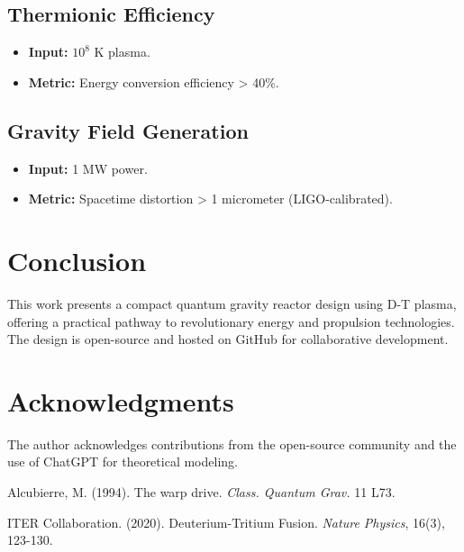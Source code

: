 \documentclass[12pt, a4paper]{article}
\begin{document}
\subsection{Thermionic Efficiency}
\begin{itemize}
\item \textbf{Input:} $10^8$ K plasma.
\item \textbf{Metric:} Energy conversion efficiency > 40\%.
\end{itemize}

\subsection{Gravity Field Generation}
\begin{itemize}
\item \textbf{Input:} 1 MW power.
\item \textbf{Metric:} Spacetime distortion > 1 micrometer (LIGO-calibrated).
\end{itemize}

\section{Conclusion}
This work presents a compact quantum gravity reactor design using D-T plasma, offering a practical pathway to revolutionary energy and propulsion technologies. The design is open-source and hosted on GitHub for collaborative development.

\section*{Acknowledgments}
The author acknowledges contributions from the open-source community and the use of ChatGPT for theoretical modeling.

\begin{thebibliography}{9}
Alcubierre, M. (1994). The warp drive. \textit{Class. Quantum Grav.} 11 L73.

ITER Collaboration. (2020). Deuterium-Tritium Fusion. \textit{Nature Physics}, 16(3), 123-130.
\end{thebibliography}
\end{document}
